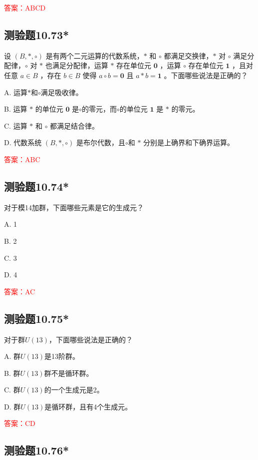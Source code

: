 \documentclass[UTF8, heading=true]{ctexart}
\begin{document}
\textcolor{red}{答案：ABCD}



\subsection{测验题10.73*}

设 $(B, *, \circ)$ 是有两个二元运算的代数系统，$*$ 和 $\circ$ 都满足交换律，$*$ 对 $\circ$ 满足分配律，$\circ$ 对 $*$ 也满足分配律，运算 $*$ 存在单位元 $\mathbf{0}$ ，运算 $\circ$ 存在单位元 $\mathbf{1}$ ，且对任意 $a \in B$ ，存在 $b \in B$ 使得 $a \circ b=\mathbf{0}$ 且 $a * b=\mathbf{1}$ 。下面哪些说法是正确的？

A. 运算$*$和$\circ$满足吸收律。

B. 运算 $*$ 的单位元 $\mathbf{0}$ 是$\circ$的零元，而$\circ$的单位元 $\mathbf{1}$ 是 $*$ 的零元。

C. 运算 $*$ 和 $\circ$ 都满足结合律。

D. 代数系统 $(B, *, \circ)$ 是布尔代数，且$\circ$和 $*$ 分别是上确界和下确界运算。

\textcolor{red}{答案：ABC}

\subsection{测验题10.74*}

对于模14加群，下面哪些元素是它的生成元？

A. 1

B. 2

C. 3

D. 4

\textcolor{red}{答案：AC}

\subsection{测验题10.75*}

对于群$U(13)$，下面哪些说法是正确的？

A. 群$U(13)$是13阶群。

B. 群$U(13)$群不是循环群。

C. 群$U(13)$的一个生成元是2。

D. 群$U(13)$是循环群，且有4个生成元。

\textcolor{red}{答案：CD}

\subsection{测验题10.76*}
\end{document}
